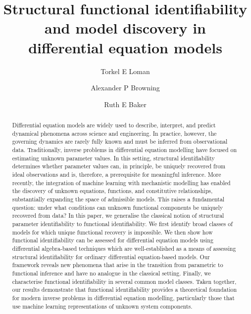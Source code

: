 \documentclass{article}
\title{Structural functional identifiability and model discovery in \\ differential equation models}
\author[1]{Torkel E Loman}
\author[2]{Alexander P Browning}
\author[1]{Ruth E Baker}
\date{}
\affil[1]{Mathematical Institute, University of Oxford, Oxford, United Kingdom}
\affil[2]{School of Mathematics and Statistics, University of Melbourne, Australia}
\theoremstyle{plain}
\theoremstyle{definition}
\begin{document}
\maketitle


\begin{abstract}

Differential equation models are widely used to describe, interpret, and predict dynamical phenomena across science and engineering. In practice, however, the governing dynamics are rarely fully known and must be inferred from observational data. Traditionally, inverse problems in differential equation modelling have focused on estimating unknown parameter values. In this setting, structural identifiability determines whether parameter values can, in principle, be uniquely recovered from ideal observations and is, therefore, a prerequisite for meaningful inference. More recently, the integration of machine learning with mechanistic modelling has enabled the discovery of unknown equations, functions, and constitutive relationships, substantially expanding the space of admissible models. This raises a fundamental question: under what conditions can unknown functional components be uniquely recovered from data? In this paper, we generalise the classical notion of structural parameter identifiability to functional identifiability. We first identify broad classes of models for which unique functional recovery is impossible. We then show how functional identifiability can be assessed for differential equation models using differential algebra-based techniques which are well-established as a means of assessing structural identifiability for ordinary differential equation-based models. Our framework reveals new phenomena that arise in the transition from parametric to functional inference and have no analogue in the classical setting. Finally, we characterise functional identifiability in several common model classes. Taken together, our results demonstrate that functional identifiability provides a theoretical foundation for modern inverse problems in differential equation modelling, particularly those that use machine learning representations of unknown system components.

\end{abstract}

\end{document}
